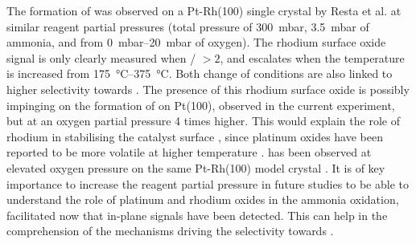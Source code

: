 The formation of  was observed on a Pt-Rh(100) single crystal by Resta et al. \parencite*{Resta2020a} at similar reagent partial pressures (total pressure of \qty{300}{\milli\bar}, \qty{3.5}{\milli\bar} of ammonia, and from \qtyrange{0}{20}{\milli\bar} of oxygen).
The rhodium surface oxide signal is only clearly measured when / $>2$, and escalates when the temperature is increased from \qtyrange{175}{375}{\degreeCelsius}.
Both change of conditions are also linked to higher selectivity towards .
The presence of this rhodium surface oxide is possibly impinging on the formation of  on Pt(100), observed in the current experiment, but at an oxygen partial pressure \num{4} times higher.
This would explain the role of rhodium in stabilising the catalyst surface \parencite{Fierro1990, Fierro1992, Bergene1996}, since platinum oxides have been reported to be more volatile at higher temperature \parencite{Alcock1960}.
 has been observed at elevated oxygen pressure on the same Pt-Rh(100) model crystal \parencite{Westerstrom2008}.
It is of key importance to increase the reagent partial pressure in future studies to be able to understand the role of platinum and rhodium oxides in the ammonia oxidation, facilitated now that in-plane signals have been detected.
This can help in the comprehension of the mechanisms driving the selectivity towards .